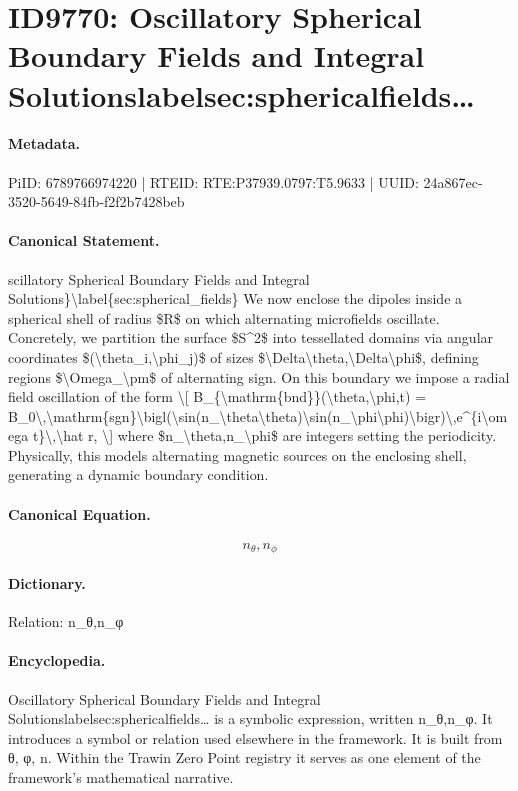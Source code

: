 \section*{ID9770: Oscillatory Spherical Boundary Fields and Integral Solutionslabelsec:sphericalfields…}
\paragraph{Metadata.}
PiID: 6789766974220 | RTEID: RTE:P37939.0797:T5.9633 | UUID: 24a867ec-3520-5649-84fb-f2f2b7428beb

\paragraph{Canonical Statement.}
scillatory Spherical Boundary Fields and Integral Solutions\}\textbackslash{}label\{sec:spherical\_fields\} We now enclose the dipoles inside a spherical shell of radius \$R\$ on which alternating microfields oscillate. Concretely, we partition the surface \$S\textasciicircum{}2\$ into tessellated domains via angular coordinates \$(\textbackslash{}theta\_i,\textbackslash{}phi\_j)\$ of sizes \$\textbackslash{}Delta\textbackslash{}theta,\textbackslash{}Delta\textbackslash{}phi\$, defining regions \$\textbackslash{}Omega\_\textbackslash{}pm\$ of alternating sign. On this boundary we impose a radial field oscillation of the form \textbackslash{}[ B\_\{\textbackslash{}mathrm\{bnd\}\}(\textbackslash{}theta,\textbackslash{}phi,t) = B\_0\textbackslash{},\textbackslash{}mathrm\{sgn\}\textbackslash{}bigl(\textbackslash{}sin(n\_\textbackslash{}theta\textbackslash{}theta)\textbackslash{}sin(n\_\textbackslash{}phi\textbackslash{}phi)\textbackslash{}bigr)\textbackslash{},e\textasciicircum{}\{i\textbackslash{}omega t\}\textbackslash{},\textbackslash{}hat r, \textbackslash{}] where \$n\_\textbackslash{}theta,n\_\textbackslash{}phi\$ are integers setting the periodicity. Physically, this models alternating magnetic sources on the enclosing shell, generating a dynamic boundary condition.

\paragraph{Canonical Equation.}
\[
n_\theta,n_\phi
\]

\paragraph{Dictionary.}
Relation: n\_θ,n\_φ

\paragraph{Encyclopedia.}
Oscillatory Spherical Boundary Fields and Integral Solutionslabelsec:sphericalfields… is a symbolic expression, written n\_θ,n\_φ. It introduces a symbol or relation used elsewhere in the framework. It is built from θ, φ, n. Within the Trawin Zero Point registry it serves as one element of the framework's mathematical narrative.
